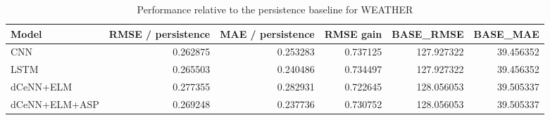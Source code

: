 \begin{table}
\caption{Performance relative to the persistence baseline for WEATHER}
\begin{tabular}{lrrrrr}
\toprule
Model & RMSE / persistence & MAE / persistence & RMSE gain & BASE\_RMSE & BASE\_MAE \\
\midrule
CNN & 0.262875 & 0.253283 & 0.737125 & 127.927322 & 39.456352 \\
LSTM & 0.265503 & 0.240486 & 0.734497 & 127.927322 & 39.456352 \\
dCeNN+ELM & 0.277355 & 0.282931 & 0.722645 & 128.056053 & 39.505337 \\
dCeNN+ELM+ASP & 0.269248 & 0.237736 & 0.730752 & 128.056053 & 39.505337 \\
\bottomrule
\end{tabular}
\end{table}

